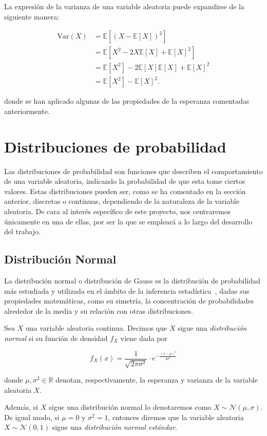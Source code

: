 \begin{observacion}
    La expresión de la varianza de una variable aleatoria puede expandirse de la siguiente manera:

    \begin{align*}
        \text{Var}(X) &= \mathbb{E}[{(X - \mathbb{E}[X])}^2] \\
        &= \mathbb{E}[X^2 - 2X\mathbb{E}[X] + \mathbb{E}{[X]}^2] \\
        &=  \mathbb{E}[X^2] - 2\mathbb{E}[X]\mathbb{E}[X] + \mathbb{E}{[X]}^2 \\
        &= \mathbb{E}[X^2]  - \mathbb{E}{[X]}^2.
    \end{align*}

    donde se han aplicado algunas de las propiedades de la esperanza comentadas anteriormente.
\end{observacion}

\section{Distribuciones de probabilidad}

Las distribuciones de probabilidad son funciones que describen el comportamiento de una variable aleatoria, indicando la probabilidad de que esta tome ciertos valores. Estas distribuciones pueden ser, como se ha comentado en la sección anterior, discretas o continuas, dependiendo de la naturaleza de la variable aleatoria. De cara al interés específico de este proyecto, nos centraremos únicamente en una de ellas, por ser la que se empleará a lo largo del desarrollo del trabajo.\newline

\subsection{Distribución Normal}
La distribución normal o distribución de Gauss es la distribución de probabilidad más estudiada y utilizada en el ámbito de la inferencia estadística~\cite{Bryc1995TheND}, dadas sus propiedades matemáticas, como su simetría, la concentración de probabilidades alrededor de la media y su relación con otras distribuciones.\newline

\begin{definicion}
    Sea $X$ una variable aleatoria continua. Decimos que $X$ sigue una \emph{distribución normal} si su función de densidad $f_X$ viene dada por

    \[ f_X(x) = \frac{1}{\sqrt{2\pi \sigma^2}} \cdot e^{-\frac{{(x - \mu)}^2}{2\sigma^2}} \]

    donde $\mu, \sigma^2 \in \mathbb{R}$ denotan, respectivamente, la esperanza y varianza de la variable aleatoria $X$.\newline

    Además, si $X$ sigue una distribución normal lo denotaremos como $X \sim \mathcal{N}(\mu,\sigma)$. De igual modo, si $\mu = 0$ y $\sigma^2=1$, entonces diremos que la variable aleatoria $X \sim \mathcal{N}(0,1)$ sigue una \emph{distribución normal estándar}.\newline
\end{definicion}

